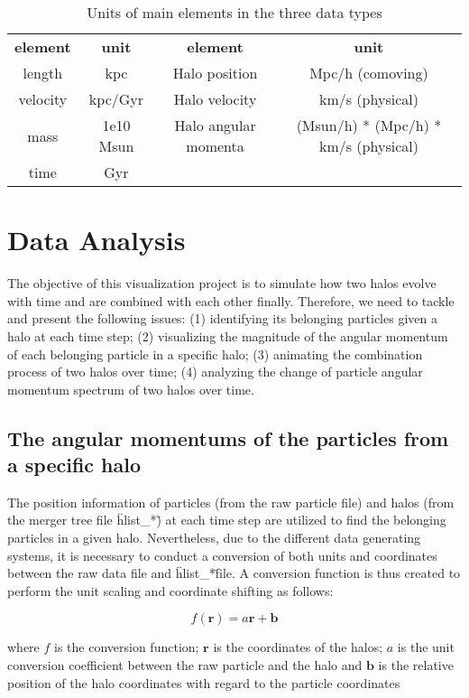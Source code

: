 \documentclass[12pt]{article}
\renewcommand{\vec}[1]{\mathbf{#1}}
\begin{document}
\begin{table}[h]
\caption {Units of main elements in the three data types} \label{tab:title} 
\begin{tabular}{|c|c|c|c}
 {\bf element} & {\bf unit} & {\bf element} & {\bf unit}  \\
 length & kpc & Halo position & Mpc/h (comoving)   \\
 velocity & kpc/Gyr & Halo velocity & km/s (physical)  \\
 mass & 1e10 Msun  & Halo angular momenta & (Msun/h) * (Mpc/h) * km/s (physical)  \\
 time & Gyr &  &  
\end{tabular}
\end{table}


\section{Data Analysis}
The objective of this visualization project is to simulate how two halos evolve with 
time and are combined with each other finally. Therefore, we need to tackle and present
the following issues: (1) identifying its belonging particles given a halo at each time 
step; (2) visualizing the magnitude of the angular momentum of each belonging particle 
in a specific halo; (3) animating the combination process of two halos over time;
(4) analyzing the change of particle angular momentum spectrum of two halos over time.

\subsection{The angular momentums of the particles from a specific halo}
The position information of particles (from the raw particle file) and halos (from the 
merger tree file \"hlist_*\") at each time step are utilized to find the belonging particles
in a given halo. Nevertheless, due to the different data generating systems, it is necessary 
to conduct a conversion of both units and coordinates between the raw data file and 
\"hlist_*\" file. A conversion function is thus created to perform the unit scaling and
coordinate shifting as follows:

\begin{equation}
f(\vec{r}) = a \vec{r} + \vec{b}
\end{equation}

where $f$ is the conversion function; $\vec{r}$ is the coordinates of the halos; 
$a$ is the unit conversion coefficient between the raw particle and the halo and 
$\vec{b}$ is the relative position of the halo coordinates with regard to the particle
coordinates
\end{document}
